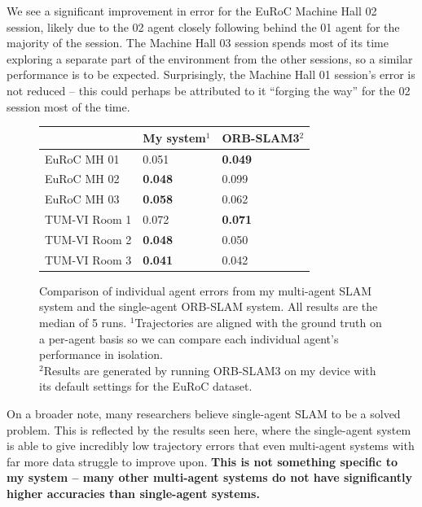 We see a significant improvement in error for the EuRoC Machine Hall 02 session, likely due to the 02 agent closely following behind the 01 agent for the majority of the session. The Machine Hall 03 session spends most of its time exploring a separate part of the environment from the other sessions, so a similar performance is to be expected. Surprisingly, the Machine Hall 01 session's error is not reduced – this could perhaps be attributed to it ``forging the way'' for the 02 session most of the time. 

\begin{figure}[h]
    \centering
    \def\arraystretch{1.2}
    \begin{tabular}{ |l|l|l| }
        \cline{2-3}
        \multicolumn{1}{c|}{} & My system$^1$  & ORB-SLAM3$^2$  \\
        \hline
        EuRoC MH 01           & 0.051          & \textbf{0.049} \\
        EuRoC MH 02           & \textbf{0.048} & 0.099          \\
        EuRoC MH 03           & \textbf{0.058} & 0.062          \\
        \hline
        TUM-VI Room 1         & 0.072          & \textbf{0.071} \\
        TUM-VI Room 2         & \textbf{0.048} & 0.050          \\
        TUM-VI Room 3         & \textbf{0.041} & 0.042          \\
        \hline
    \end{tabular}

    \caption{Comparison of individual agent errors from my multi-agent SLAM system and the single-agent ORB-SLAM system. All results are the median of 5 runs. \captionbreak $^1$Trajectories are aligned with the ground truth on a per-agent basis so we can compare each individual agent's performance in isolation. \\ $^2$Results are generated by running ORB-SLAM3 on my device with its default settings for the EuRoC dataset.}
    \label{fig:comparison-to-single-agent-systems}
\end{figure}

On a broader note, many researchers believe single-agent SLAM to be a solved problem. This is reflected by the results seen here, where the single-agent system is able to give incredibly low trajectory errors that even multi-agent systems with far more data struggle to improve upon. \textbf{This is not something specific to my system – many other multi-agent systems do not have significantly higher accuracies than single-agent systems.}

